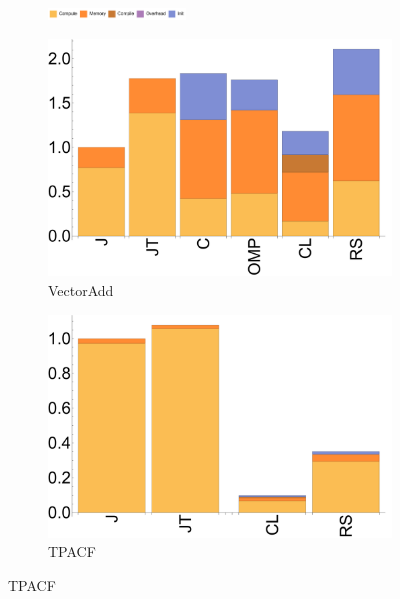 \begin{figure}[ht]

  \begin{subfigure}[b]{\textwidth}
          \centering
          \includegraphics[width=0.4\textwidth]{data/legend.pdf}
  \end{subfigure}

  \begin{subfigure}[b]{0.3\textwidth}
      \includegraphics[width=\textwidth]{data/bbattery_vectoradd_nexus5.pdf}
      \caption{VectorAdd}\label{fig:b_vectoradd}
  \end{subfigure}

  \begin{subfigure}[b]{0.3\textwidth}
      \includegraphics[width=\textwidth]{data/bbattery_tpacf_nexus5.pdf}
      \caption{TPACF} \label{fig:b_TPACF}
  \end{subfigure}


\end{figure}
